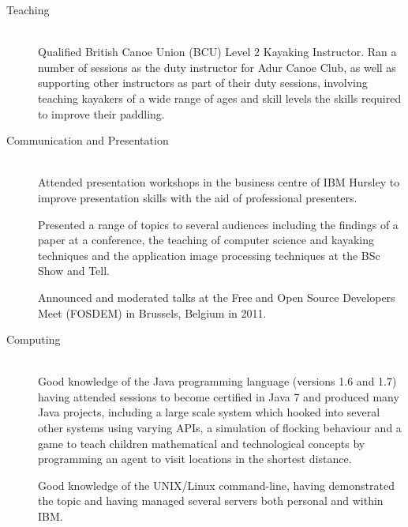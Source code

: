 \documentclass[letterpaper,11pt]{article}
\begin{document}
\vspace{-16pt}
\begin{description}
\item[Teaching] \hfill \\
Qualified British Canoe Union (BCU) Level 2 Kayaking Instructor. Ran a number 
of sessions as the duty instructor for Adur Canoe Club, as well as supporting 
other instructors as part of their duty sessions, involving teaching kayakers 
of a wide range of ages and skill levels the skills required to improve their 
paddling.

\item[Communication and Presentation] \hfill \\
Attended presentation workshops in the business centre of IBM Hursley to 
improve presentation skills with the aid of professional presenters.

Presented a range of topics to several audiences including the findings of a 
paper at a conference, the teaching of computer science and kayaking techniques
and the application image processing techniques at the BSc Show and Tell.

Announced and moderated talks at the Free and Open Source Developers Meet 
(FOSDEM) in Brussels, Belgium in 2011.

\item[Computing] \hfill \\
Good knowledge of the Java programming language (versions 1.6 and 1.7) having 
attended sessions to become certified in Java 7 and produced many Java 
projects, including a large scale system which hooked into several other 
systems using varying APIs, a simulation of flocking behaviour and a game to 
teach children mathematical and technological concepts by programming an agent 
to visit locations in the shortest distance.

Good knowledge of the UNIX/Linux command-line, having demonstrated the topic 
and having managed several servers both personal and within IBM.


\end{description}

\end{document}
